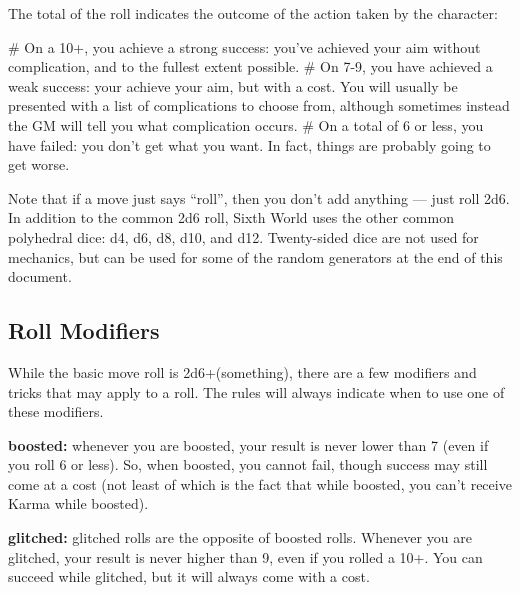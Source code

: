 
The total of the roll indicates the outcome of the action taken by the character:

\begin{easylist}
    # On a 10+, you achieve a strong success: you've achieved your aim without complication, and to the fullest extent possible.
    # On 7-9, you have achieved a weak success: your achieve your aim, but with a cost. You will usually be presented with a list of complications to choose from, although sometimes instead the GM will tell you what complication occurs.
    # On a total of 6 or less, you have failed: you don’t get what you want. In fact, things are probably going to get worse.
\end{easylist}

Note that if a move just says ``roll'', then you don’t add anything — just roll 2d6. In addition to the common 2d6 roll, Sixth World uses the other common polyhedral dice: d4, d6, d8, d10, and d12. Twenty-sided dice are not used for mechanics, but can be used for some of the random generators at the end of this document.


\subsection{Roll Modifiers}
While the basic move roll is 2d6+(something), there are a few modifiers and tricks that may apply to a roll. The rules will always indicate when to use one of these modifiers.

\textbf{boosted:} whenever you are boosted, your result is never lower than 7 (even if you roll 6 or less). So, when boosted, you cannot fail, though success may still come at a cost (not least of which is the fact that while boosted, you can’t receive Karma while boosted).

\textbf{glitched:} glitched rolls are the opposite of boosted rolls. Whenever you are glitched, your result is never higher than 9, even if you rolled a 10+. You can succeed while glitched, but it will always come with a cost.

